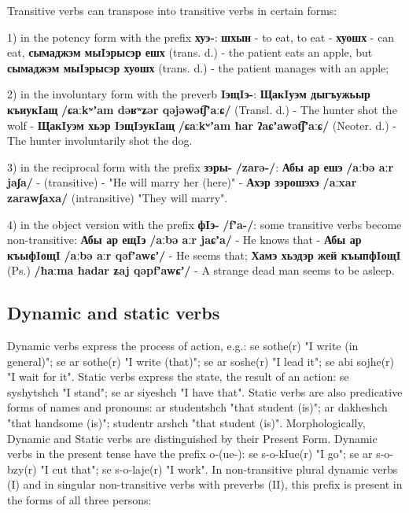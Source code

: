 \documentclass[a4paper,12pt]{book}
\newcommand{\1}[1]{\textbf{\emph{#1}}} %
\newcommand{\2}[1]{\textbf{[#1]}} %
\newcommand{\3}[1]{\fontsize{11pt}{0cm}\textbf{\emph{#1}}} %
\newcommand{\4}[1]{\fontsize{10pt}{0cm}\emph{#1}}	%
\newcommand{\5}[1]{\textbf{/#1/}} %
\newcommand{\6}[1]{\textbf{[#1]}} %
\newcommand{\7}[1]{\fontsize{12pt}{0cm}\emph{#1}} %
\newcommand{\8}[1]{\fontsize{12pt}{0cm}`#1'} %
\newcommand{\9}[1]{\fontsize{12pt}{0cm}(lit. `#1')} %
\newcommand{\glossphonemics}[1]{\textbf{/#1/}} %
\begin{document}
Transitive verbs can transpose into transitive verbs in certain forms:

1) in the potency form with the prefix \textbf{хуэ-}: \textbf{шхын} - to eat, to eat - \textbf{хуошх} - can eat, \textbf{сымаджэм мыIэрысэр ешх} (trans. d.) - the patient eats an apple, but \textbf{сымаджэм мыIэрысэр хуошх} (trans. d.) - the patient manages with an apple;

2) in the involuntary form with the preverb \textbf{IэщIэ-}: \textbf{ЩакIуэм дыгъужьыр къиукIащ} \glossphonemics{ɕaːkʷʼam dəʁʷʑər qəjəwət͡ʃʼaːɕ} (Transl. d.) - The hunter shot the wolf - \textbf{ЩакIуэм хьэр IэщIэукIащ} \glossphonemics{ɕaːkʷʼam ħar ʔaɕʼawət͡ʃʼaːɕ} (Neoter. d.) - The hunter involuntarily shot the dog.

3) in the reciprocal form with the prefix \textbf{зэры-} \glossphonemics{zarə-}: \textbf{Абы ар ешэ} \glossphonemics{aːbə aːr jaʃa} - (transitive) - "He will marry her (here)" - \textbf{Ахэр зэрошэхэ} \glossphonemics{aːxar zarawʃaxa} (intransitive) "They will marry".

4) in the object version with the prefix \textbf{фIэ-} \glossphonemics{fʼa-}: some transitive verbs become non-transitive: \textbf{Абы ар ещIэ} \glossphonemics{aːbə aːr jaɕʼa} - He knows that - \textbf{Абы ар къыфIощI} \glossphonemics{aːbə aːr qəfʼawɕʼ} - He seems that; \textbf{Хамэ хьэдэр жей къыпфIощI} (Ps.) \glossphonemics{ħaːma ħadar ʑaj qəpfʼawɕʼ} - A strange dead man seems to be asleep.

\subsection{Dynamic and static verbs}
Dynamic verbs express the process of action, e.g.: se sothe(r) "I write (in general)"; se ar sothe(r) "I write (that)"; se ar soshe(r) "I lead it"; se abi sojhe(r) "I wait for it".
Static verbs express the state, the result of an action: se syshytshch "I stand"; se ar siyeshch "I have that".
Static verbs are also predicative forms of names and pronouns: ar studentshch "that student (is)"; ar dakheshch "that handsome (is)"; studentr arshch "that student (is)".
Morphologically, Dynamic and Static verbs are distinguished by their Present Form. Dynamic verbs in the present tense have the prefix o-(ue-): se s-o-kIue(r) "I go"; se ar s-o-bzy(r) "I cut that"; se s-o-laje(r) "I work".
In non-transitive plural dynamic verbs (I) and in singular non-transitive verbs with preverbs (II), this prefix is present in the forms of all three persons:
\end{document}
